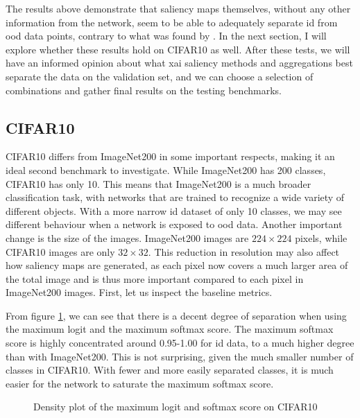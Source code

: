 \documentclass[UKenglish]{uiomasterthesis} %
\theoremstyle{definition}
\begin{document}
The results above demonstrate that saliency maps themselves, without any other information from the network, seem to be able to adequately separate \ac{id} from \ac{ood} data points, contrary to what was found by \cite{martinez}. In the next section, I will explore whether these results hold on CIFAR10 as well. After these tests, we will have an informed opinion about what \ac{xai} saliency methods and aggregations best separate the data on the validation set, and we can choose a selection of combinations and gather final results on the testing benchmarks.

\subsection{CIFAR10}

CIFAR10 differs from ImageNet200 in some important respects, making it an ideal second benchmark to investigate. While ImageNet200 has 200 classes, CIFAR10 has only 10. This means that ImageNet200 is a much broader classification task, with networks that are trained to recognize a wide variety of different objects. With a more narrow \ac{id} dataset of only 10 classes, we may see different behaviour when a network is exposed to \ac{ood} data. Another important change is the size of the images. ImageNet200 images are $224 \times 224$ pixels, while CIFAR10 images are only $32 \times 32$. This reduction in resolution may also affect how saliency maps are generated, as each pixel now covers a much larger area of the total image and is thus more important compared to each pixel in ImageNet200 images. First, let us inspect the baseline metrics.

From figure \ref{fig:cifar10_logits_distribution}, we can see that there is a decent degree of separation when using the maximum logit and the maximum softmax score. The maximum softmax score is highly concentrated around 0.95-1.00 for \ac{id} data, to a much higher degree than with ImageNet200. This is not surprising, given the much smaller number of classes in CIFAR10. With fewer and more easily separated classes, it is much easier for the network to saturate the maximum softmax score.

\begin{figure}[hbtp]
    \begin{center}
        
    \end{center}
    \caption[CIFAR10 maximum logit and softmax score distribution]{Density plot of the maximum logit and softmax score on CIFAR10}
    \label{fig:cifar10_logits_distribution}
\end{figure}
\end{document}
